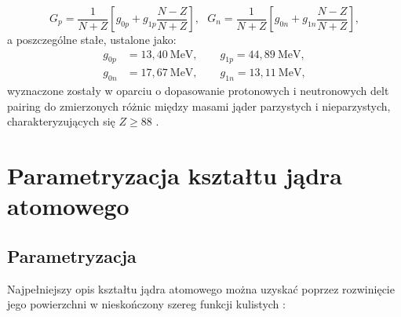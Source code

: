 \documentclass[a4paper,polish]{article}
\numberwithin{equation}{section}
\begin{document}
\begin{equation}
G_p=\frac{1}{N+Z} \left [ g_{0p} + g_{1p} \frac{N-Z}{N+Z} \right ],  ~~~G_n=\frac{1}{N+Z} \left [ g_{0n} + g_{1n} \frac{N-Z}{N+Z} \right ],
\end{equation}
a poszczególne stałe, ustalone jako:
\begin{align*}
g_{0p}&=13,40~\mathrm{MeV}, \qquad g_{1p}=44,89~\mathrm{MeV}, \\
g_{0n}&=17,67~\mathrm{MeV}, \qquad g_{1n}=13,11~\mathrm{MeV},
\end{align*}
wyznaczone zostały w oparciu o dopasowanie protonowych i neutronowych delt pairing do zmierzonych różnic między masami jąder parzystych i nieparzystych, charakteryzujących się $Z \ge 88$ \cite{Muntian}.

\clearpage
\section{Parametryzacja kształtu jądra atomowego}

\subsection{Parametryzacja \boldmath{$\beta$}}

Najpełniejszy opis kształtu jądra atomowego można uzyskać poprzez rozwinięcie jego powierzchni w nieskończony szereg funkcji kulistych \cite{Pomorski} :
\end{document}
